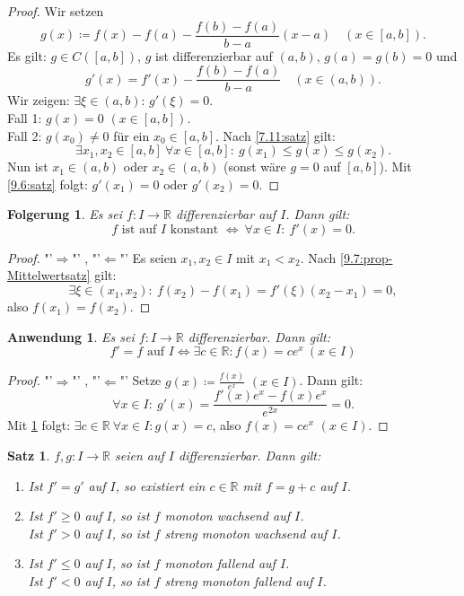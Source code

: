 \documentclass[12pt]{extreport} %
\newcommand{\R}{\mathbb{R}}
\theoremstyle{named}
\theoremstyle{itshape}
\newtheorem{satz}[unnamedtheorem]{Satz}
\theoremstyle{normal}
\newtheorem{folgerung}[unnamedtheorem]{Folgerung}
\newtheorem{anwendung}[unnamedtheorem]{Anwendung}
\begin{document}
{\begin{proof}
	Wir setzen
	$$g(x) \coloneqq f(x) - f(a) - \frac{f(b) - f(a)}{b - a} (x - a) \quad (x \in [a, b]).$$ Es gilt: $g \in C([a, b])$, $g$ ist differenzierbar auf $(a, b)$, $g(a) = g(b) = 0$ und 
		$$ g'(x) = f'(x) - \frac{f(b) - f(a)}{b - a} \quad (x \in (a, b)). $$
	Wir zeigen: $\exists \xi \in (a, b)$: $g'(\xi) = 0$. \\
	Fall 1: $g(x) = 0$ $(x \in [a,b])$. \checkmark \\
	Fall 2: $g(x_0) \not= 0$ f\"ur ein $x_0 \in [a,b]$. Nach \ref{7.11:satz} gilt:
	$$\exists x_{1}, x_{2} \in [a, b] ~ \forall x \in [a, b]: ~ g(x_{1}) \leq g(x) \leq g(x_{2}).$$
	Nun ist $x_{1} \in (a, b)$ oder $x_{2} \in (a, b)$ (sonst wäre $g = 0$ auf $[a,b]$). Mit \ref{9.6:satz} folgt: $g'(x_{1}) = 0$ oder $g'(x_{2}) = 0$.
\end{proof}


\begin{folgerung} \label{9.8:folg}
	Es sei $f \colon I \rightarrow \R$ differenzierbar auf $I$. Dann gilt: 
	$$f \text{ ist auf } I \text { konstant } \iff ~ \forall x \in I: ~ f'(x)=0. $$	
\end{folgerung}

\begin{proof}
	"'$\Rightarrow$"' \checkmark, "'$\Leftarrow$"' Es seien $x_{1}, x_{2} \in I$ mit $x_{1} < x_{2}$. Nach \ref{9.7:prop-Mittelwertsatz} gilt:
		$$ \exists \xi \in (x_{1}, x_{2}): ~ f(x_{2}) - f(x_{1}) = f'(\xi) (x_{2} - x_{1}) = 0, $$ 
	also $f(x_{1}) = f(x_{2})$.
\end{proof}


\begin{anwendung} \label{9.9:anwendung}
	Es sei $f \colon I \rightarrow \R$ differenzierbar. Dann gilt: 
		$$ f' = f \text{ auf } I \iff \exists c \in \R: f(x) = c e^{x} ~(x \in I) $$
\end{anwendung}

\begin{proof}
	"'$\Rightarrow$"' \checkmark, "'$\Leftarrow$"' Setze $g(x) \coloneqq \frac{f(x)}{e^{x}}$ $(x \in I)$. Dann gilt:
	$$ \forall x \in I: ~ g'(x) = \frac{f'(x) e^{x} - f(x) e^x}{e^{2x}} = 0. $$
	Mit \ref{9.8:folg} folgt: $\exists c \in \R ~\forall x \in I:  g(x) = c$, also $f(x)=c e^x$ $(x \in I)$.
\end{proof}


\begin{satz} \label{9.10:satz}
	$f, g \colon I \rightarrow \R$ seien auf $I$ differenzierbar. Dann gilt:
	\begin{enumerate}
		\item Ist $f' = g'$ auf $I$, so existiert ein $c \in \R$ mit $f = g + c$ auf $I$.
		\item Ist $f' \geq 0$ auf $I$, so ist $f$ monoton wachsend auf $I$. \\
				Ist $f' > 0$ auf $I$, so ist $f$ streng monoton wachsend auf $I$.
		\item Ist $f' \leq 0$ auf $I$, so ist $f$ monoton fallend auf $I$. \\
				Ist $f' < 0$ auf $I$, so ist $f$ streng monoton fallend auf $I$.
	\end{enumerate}
\end{satz}

}
\end{document}
